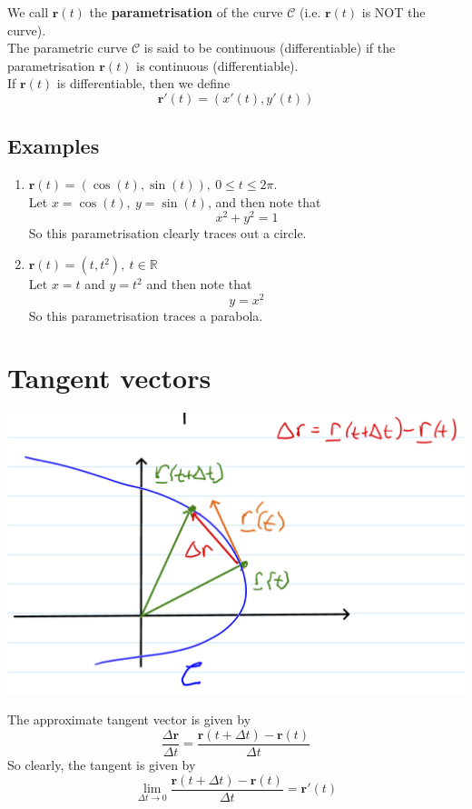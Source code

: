 \documentclass[11pt]{article}
\newcommand{\reals}{\mathbb{R}}
\renewcommand{\vec}[1]{\mathbf{#1}}
\begin{document}
We call $\vec{r}(t)$ the \textbf{parametrisation} of the curve $\mathcal{C}$ (i.e. $\vec{r}(t)$ is NOT the curve). \\
The parametric curve $\mathcal{C}$ is said to be continuous (differentiable) if the parametrisation $\vec{r}(t)$ is continuous (differentiable). \\
If $\vec{r}(t)$ is differentiable, then we define
\[ \vec{r}'(t) = (x'(t), y'(t)) \]

\subsection{Examples}
\begin{enumerate}
\item $ \vec{r}(t) = (\cos(t), \sin(t)),\ 0 \leq t \leq 2\pi $. \\
Let $x = \cos(t),\ y = \sin(t)$, and then note that
\[ x^2 + y^2 = 1\]
So this parametrisation clearly traces out a circle.

\item $\vec{r}(t) = (t, t^2),\ t \in \reals$\\
Let $x=t$ and $y=t^2$ and then note that
\[ y = x^2 \]
So this parametrisation traces a parabola.
\end{enumerate}

\section{Tangent vectors}
\begin{center} \includegraphics[scale=0.75]{tangent_vector} \end{center}

The approximate tangent vector is given by
\[ \frac{\Delta \vec{r}}{\Delta t} = \frac{\vec{r}(t + \Delta t) - \vec{r}(t)}{\Delta t} \]
So clearly, the tangent is given by
\[ \lim_{\Delta t \rightarrow 0} \frac{\vec{r}(t + \Delta t) - \vec{r}(t)}{\Delta t} = \vec{r}'(t) \]
\end{document}
